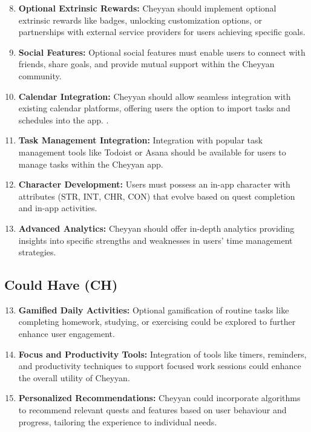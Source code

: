 \documentclass{l4proj}
\begin{document}
\begin{enumerate}
    \setcounter{enumi}{7}
    \item \textbf{Optional Extrinsic Rewards:} Cheyyan should implement optional extrinsic rewards like badges, unlocking customization options, or partnerships with external service providers for users achieving specific goals.
    
    \item \textbf{Social Features:} Optional social features must enable users to connect with friends, share goals, and provide mutual support within the Cheyyan community.
    
    \item \textbf{Calendar Integration:} Cheyyan should allow seamless integration with existing calendar platforms, offering users the option to import tasks and schedules into the app.
.
    
    \item \textbf{Task Management Integration:} Integration with popular task management tools like Todoist or Asana should be available for users to manage tasks within the Cheyyan app.

    \item \textbf{Character Development:} Users must possess an in-app character with attributes (STR, INT, CHR, CON) that evolve based on quest completion and in-app activities.
    
    \item \textbf{Advanced Analytics:} Cheyyan should offer in-depth analytics providing insights into specific strengths and weaknesses in users' time management strategies.
\end{enumerate}

\subsection{Could Have (CH)}

\begin{enumerate}
    \setcounter{enumi}{12}
    \item \textbf{Gamified Daily Activities:} Optional gamification of routine tasks like completing homework, studying, or exercising could be explored to further enhance user engagement.
    
    \item \textbf{Focus and Productivity Tools:} Integration of tools like timers, reminders, and productivity techniques to support focused work sessions could enhance the overall utility of Cheyyan.
    
    \item \textbf{Personalized Recommendations:} Cheyyan could incorporate algorithms to recommend relevant quests and features based on user behaviour and progress, tailoring the experience to individual needs.
\end{enumerate}
\end{document}
